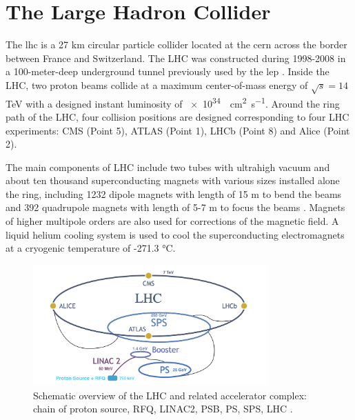 
\section{The Large Hadron Collider}
\label{sec:cmsexperiment:lhc}

The \acrfull{lhc} \cite{exhep:lhc:Evans:2008zzb} is a 27 \si{\km} circular particle collider located at the \acrfull{cern} across the border between France and Switzerland. The LHC was constructed during 1998-2008 in a 100-meter-deep underground tunnel previously used by the \acrfull{lep} \cite{exhep:lep:Myers:1991ym}. Inside the LHC, two proton beams collide at a maximum center-of-mass energy of $\sqrt{s}=14$ TeV with a designed instant luminosity of \SI{e34}{\per\cm\squared \per\s}. Around the ring path of the LHC, four collision positions are designed corresponding to four LHC experiments: CMS \cite{exhep:cms:Chatrchyan:2008aa} (Point 5), ATLAS \cite{exhep:atlas:Aad:2008zzm} (Point 1), LHCb \cite{exhep:lhcb:Alves:2008zz} (Point 8) and Alice \cite{exhep:alice:Aamodt:2008zz} (Point 2).


The main components of LHC include two tubes with ultrahigh vacuum and about ten thousand superconducting magnets with various sizes installed alone the ring, including 1232 dipole magnets with length of 15 \si{\m} to bend the beams and 392 quadrupole magnets with length of 5-7 \si{\m} to focus the beams \cite{exhep:lhcFactsFigures}. Magnets of higher multipole orders are also used for corrections of the magnetic field. A liquid helium cooling system is used to cool the superconducting electromagnets at a cryogenic temperature of -271.3 \si{\degreeCelsius}. 


\begin{figure}[ht]
    \centering
    \includegraphics[width=0.8\textwidth]{chapters/CMSExperiment/sectionLHC/figures/lhc.png}
    \caption{Schematic overview of the LHC and related accelerator complex: chain of proton source, RFQ, LINAC2, PSB, PS, SPS, LHC \cite{exhep:lhcInject:Benedikt:2004wm}.}
    \label{fig:cmsexperiment:lhc:map}
\end{figure}



